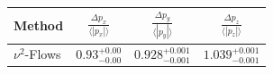     \begin{tabular}{lccc}
        \toprule
        Method & $\frac{\Delta p_x}{\langle |p_x|\rangle}$ & $\frac{\Delta p_y}{\langle |p_y|\rangle}$ & $\frac{\Delta p_z}{\langle |p_z|\rangle}$ \\
        \midrule
        $\nu^2$-Flows & $0.93_{-0.00}^{+0.00}$ & $0.928_{-0.001}^{+0.001}$ & $1.039_{-0.001}^{+0.001}$ \\
        \bottomrule
    \end{tabular}
